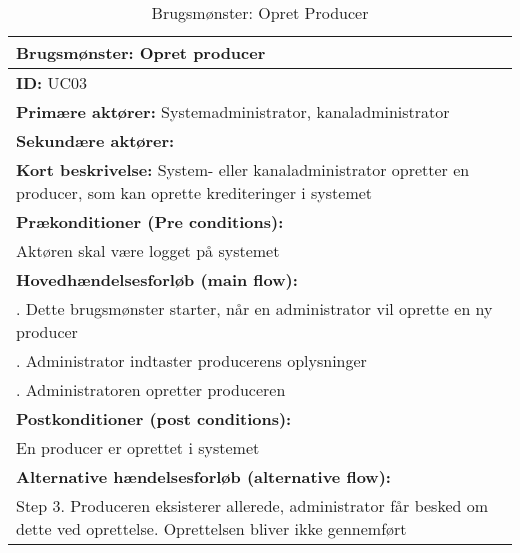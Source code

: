         

\begin{table}[H]
    \begin{tabularx}{\textwidth}{|>{\RaggedRight}X|}
        \hline
        \textbf{Brugsmønster:}  Opret producer \\ \hline
        \textbf{ID:} UC03 \\ \hline
        \textbf{Primære aktører:} Systemadministrator, kanaladministrator \\ \hline
        \textbf{Sekundære aktører:} \\ \hline
        \textbf{Kort beskrivelse:} System- eller kanaladministrator opretter en producer, som kan oprette       krediteringer i systemet \\ \hline
        \textbf{Prækonditioner (Pre conditions):} \\
        Aktøren skal være logget på systemet \\ \hline
        \textbf{Hovedhændelsesforløb (main flow):} \\
            1. Dette brugsmønster starter, når en administrator vil oprette en ny producer \\
            2. Administrator indtaster producerens oplysninger \\ 
            3. Administratoren opretter produceren \\ \hline
        \textbf{Postkonditioner (post conditions):} \\
            En producer er oprettet i systemet \\ \hline
        \textbf{Alternative hændelsesforløb (alternative flow):} \\ Step 3. Produceren eksisterer allerede,     administrator får besked om dette ved oprettelse. Oprettelsen bliver ikke gennemført \\
        \hline
    \end{tabularx}
    \caption{Brugsmønster: Opret Producer}
    \label{table:create_producer}
\end{table}


